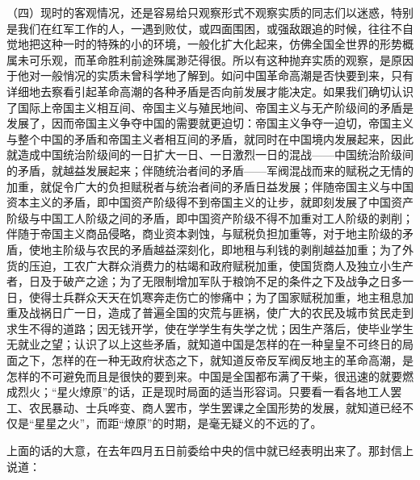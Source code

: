 \documentclass[UTF8, 12pt, a4paper]{ctexrep}
\begin{document}
（四）现时的客观情况，还是容易给只观察形式不观察实质的同志们以迷惑，特别是我们在红军工作的人，一遇到败仗，或四面围困，或强敌跟追的时候，往往不自觉地把这种一时的特殊的小的环境，一般化扩大化起来，仿佛全国全世界的形势概属未可乐观，而革命胜利前途殊属渺茫得很。所以有这种抛弃实质的观察，是原因于他对一般悄况的实质未曾科学地了解到。如问中国革命高潮是否快要到来，只有详细地去察看引起革命高潮的各种矛盾是否向前发展才能决定。如果我们确切认识了国际上帝国主义相互间、帝国主义与殖民地间、帝国主义与无产阶级间的矛盾是发展了，因而帝国主义争夺中国的需要就更迫切：帝国主义争夺一迫切，帝国主义与整个中国的矛盾和帝国主义者相互间的矛盾，就同时在中国境内发展起来，因此就造成中国统治阶级间的一日扩大一日、一日激烈一日的混战——中国统治阶级间的矛盾，就越益发展起来；伴随统治者间的矛盾——军阀混战而来的赋税之无情的加重，就促令广大的负担赋税者与统治者间的矛盾日益发展；伴随帝国主义与中国资本主义的矛盾，即中国资产阶级得不到帝国主义的让步，就即刻发展了中国资产阶级与中国工人阶级之间的矛盾，即中国资产阶级不得不加重对工人阶级的剥削；伴随于帝国主义商品侵略，商业资本剥蚀，与赋税负担加重等，对于地主阶级的矛盾，使地主阶级与农民的矛盾越益深刻化，即地租与利钱的剥削越益加重；为了外货的压迫，工农广大群众消费力的枯竭和政府赋税加重，使国货商人及独立小生产者，日及于破产之途；为了无限制增加军队于粮饷不足的条件之下及战争之日多一日，使得士兵群众天天在饥寒奔走伤亡的惨痛中；为了国家赋税加重，地主租息加重及战祸日广一日，造成了普遍全国的灾荒与匪祸，使广大的农民及城市贫民走到求生不得的道路；因无钱开学，使在学学生有失学之忧；因生产落后，使毕业学生无就业之望；认识了以上这些矛盾，就知道中国是怎样的在一种皇皇不可终日的局面之下，怎样的在一种无政府状态之下，就知道反帝反军阀反地主的革命高潮，是怎样的不可避免而且是很快的要到来。中国是全国都布满了干柴，很迅速的就要燃成烈火；“星火燎原”的话，正是现时局面的适当形容词。只要看一看各地工人罢工、农民暴动、士兵哗变、商人罢市，学生罢课之全国形势的发展，就知道已经不仅是“星星之火”，而距“燎原”的时期，是毫无疑义的不远的了。

上面的话的大意，在去年四月五日前委给中央的信中就已经表明出来了。那封信上说道：
\end{document}
